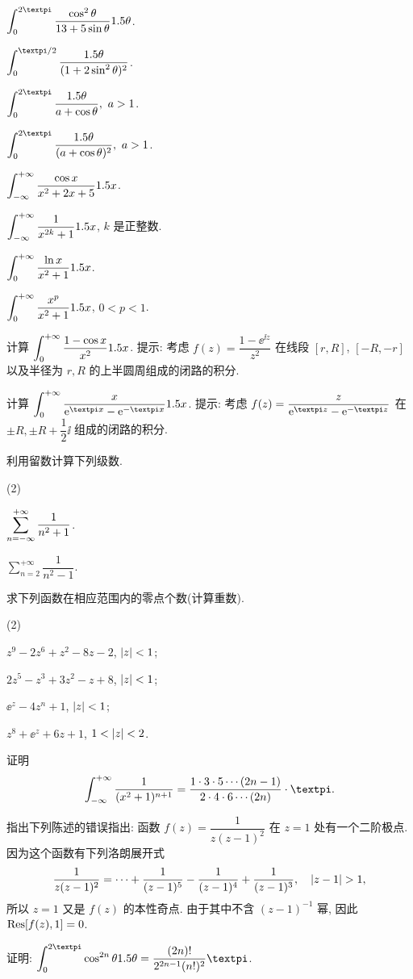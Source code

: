 \begin{homework}
\begin{homework}
\begin{subhomework}
      \item $\dint_0^{2\cpi}\frac{\cos^2\theta}{13+5\sin\theta}\d \theta$.
      \item $\dint_0^{\cpi/2}\dfrac{\d \theta}{(1+2\sin^2\theta)^2}$.
      \item $\dint_0^{2\cpi}\dfrac{\d \theta}{a+\cos\theta},\ a>1$.
      \item $\dint_0^{2\cpi}\dfrac{\d \theta}{(a+\cos\theta)^2},\ a>1$.
      \item $\displaystyle\int_{-\infty}^{+\infty} \dfrac{\cos x}{x^2+2x+5}1.5 x$.
      \item $\displaystyle\int_{-\infty}^{+\infty} \frac{1}{x^{2k}+1}1.5 x$, $k$ 是正整数.
      \item $\displaystyle\int_0^{+\infty}\frac{\ln x}{x^2+1}1.5 x$.
      \item $\displaystyle\int_0^{+\infty}\frac{x^p}{x^2+1}1.5 x$, $0<p<1$.
    \end{subhomework}
    \item \optionalex 计算 $\displaystyle\int_0^{+\infty} \frac{1-\cos x}{x^2}1.5 x$.
    提示: 考虑 $f(z)=\dfrac{1-\ee^{\ii z}}{z^2}$ 在线段 $[r,R]$, $[-R,-r]$ 以及半径为 $r,R$ 的上半圆周组成的闭路的积分.
    \item \optionalex 计算 $\intf \frac{x}{\ee^{\cpi x}-\ee^{-\cpi x}}\d x$.
    提示: 考虑 $f(z)=\dfrac{z}{\ee^{\cpi z}-\ee^{-\cpi z}}$ 在 $\pm R,\pm R+\dfrac12\ii$ 组成的闭路的积分.
    \item \optionalex 利用留数计算下列级数.
    \begin{subhomework}(2)
      \item $\displaystyle\sum_{n=-\infty}^{+\infty} \dfrac1{n^2+1}$.
      \item $\displaystyle\sum_{n=2}^{+\infty} \dfrac1{n^2-1}$.
    \end{subhomework}
    \item \optionalex 求下列函数在相应范围内的零点个数(计算重数).
    \begin{subhomework}(2)
      \item $z^9-2z^6+z^2-8z-2$, $\lvert z\rvert<1$;
      \item $2z^5-z^3+3z^2-z+8$, $\lvert z\rvert<1$;
      \item $\ee^z-4z^n+1$, $\lvert z\rvert<1$;
      \item $z^8+\ee^z+6z+1$, $1<\lvert z\rvert<2$.
    \end{subhomework}
    \item 证明
    \[
      \intff \frac1{(x^2+1)^{n+1}}
      =\frac{1\cdot 3\cdot 5\cdots(2n-1)}{2\cdot 4\cdot6\cdots(2n)}\cdot \cpi.
    \]
    \item 指出下列陈述的错误指出: 函数 $f(z)=\dfrac1{z(z-1)^2}$ 在 $z=1$ 处有一个二阶极点. 因为这个函数有下列洛朗展开式
      \[
        \frac1{z(z-1)^2}=\cdots+\frac1{(z-1)^5}-\frac1{(z-1)^4}+\frac1{(z-1)^3},\quad\lvert z-1\rvert>1,
      \]
      所以 $z=1$ 又是 $f(z)$ 的本性奇点. 由于其中不含 $(z-1)^{-1}$ 幂, 因此 ${\mathrm{Res}}[f(z),1]=0$.
    \item 证明: $\dint_0^{2\cpi}\cos^{2n}\theta\d \theta=\dfrac{(2n)!}{2^{2n-1}(n!)^2}\cpi$.
  \end{homework}
\end{homework}
